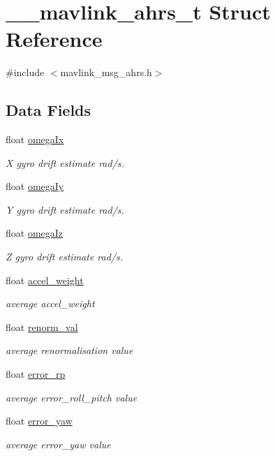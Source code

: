 \hypertarget{struct____mavlink__ahrs__t}{\section{\+\_\+\+\_\+mavlink\+\_\+ahrs\+\_\+t Struct Reference}
\label{struct____mavlink__ahrs__t}
}


{\ttfamily \#include $<$mavlink\+\_\+msg\+\_\+ahrs.\+h$>$}

\subsection*{Data Fields}
\begin{DoxyCompactItemize}
\item 
float \hyperlink{struct____mavlink__ahrs__t_a799a878adcd1837bb8bcb5ce0af37311}{omega\+Ix}
\begin{DoxyCompactList}\small\item\em X gyro drift estimate rad/s. \end{DoxyCompactList}\item 
float \hyperlink{struct____mavlink__ahrs__t_a0c47a70ed78c739cb99581bc01a292b9}{omega\+Iy}
\begin{DoxyCompactList}\small\item\em Y gyro drift estimate rad/s. \end{DoxyCompactList}\item 
float \hyperlink{struct____mavlink__ahrs__t_a5c67391e53eff953940817d638739ed3}{omega\+Iz}
\begin{DoxyCompactList}\small\item\em Z gyro drift estimate rad/s. \end{DoxyCompactList}\item 
float \hyperlink{struct____mavlink__ahrs__t_af784e223fbbd06a561b04fb564e3a493}{accel\+\_\+weight}
\begin{DoxyCompactList}\small\item\em average accel\+\_\+weight \end{DoxyCompactList}\item 
float \hyperlink{struct____mavlink__ahrs__t_a59e54e67dd062055d7553cf4a76cbb2b}{renorm\+\_\+val}
\begin{DoxyCompactList}\small\item\em average renormalisation value \end{DoxyCompactList}\item 
float \hyperlink{struct____mavlink__ahrs__t_a5c6e55772a74e80eb2e036c1f283e128}{error\+\_\+rp}
\begin{DoxyCompactList}\small\item\em average error\+\_\+roll\+\_\+pitch value \end{DoxyCompactList}\item 
float \hyperlink{struct____mavlink__ahrs__t_ab100e9758e39284cdcac30757826ae4f}{error\+\_\+yaw}
\begin{DoxyCompactList}\small\item\em average error\+\_\+yaw value \end{DoxyCompactList}\end{DoxyCompactItemize}


